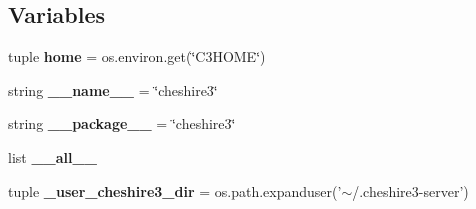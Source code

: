 \subsection*{Variables}
\begin{DoxyCompactItemize}
\item 
\hypertarget{namespacecheshire3_ac91cf6be86e437dd4bf94e00939dea65}{tuple {\bfseries home} = os.\-environ.\-get(\char`\"{}C3\-H\-O\-M\-E\char`\"{})}\label{namespacecheshire3_ac91cf6be86e437dd4bf94e00939dea65}

\item 
\hypertarget{namespacecheshire3_a4d13754bf196c1e09f34c930244b21a8}{string {\bfseries \-\_\-\-\_\-name\-\_\-\-\_\-} = \char`\"{}cheshire3\char`\"{}}\label{namespacecheshire3_a4d13754bf196c1e09f34c930244b21a8}

\item 
\hypertarget{namespacecheshire3_a943bff3c0ebe6ba7d81bdf6e0d6238de}{string {\bfseries \-\_\-\-\_\-package\-\_\-\-\_\-} = \char`\"{}cheshire3\char`\"{}}\label{namespacecheshire3_a943bff3c0ebe6ba7d81bdf6e0d6238de}

\item 
list {\bfseries \-\_\-\-\_\-all\-\_\-\-\_\-}
\item 
\hypertarget{namespacecheshire3_a56a20037fa68cb3cad35863b40a4e9a3}{tuple {\bfseries \-\_\-user\-\_\-cheshire3\-\_\-dir} = os.\-path.\-expanduser('$\sim$/.cheshire3-\/server')}\label{namespacecheshire3_a56a20037fa68cb3cad35863b40a4e9a3}

\end{DoxyCompactItemize}


